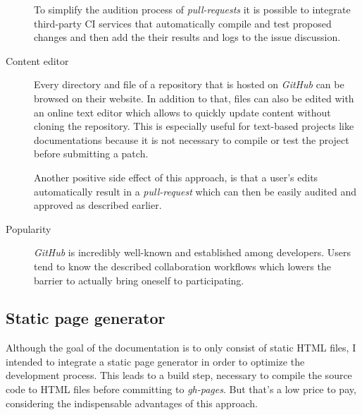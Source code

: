 \begin{description}
	To simplify the audition process of \textit{pull-requests} it is possible to integrate third-party \ac{CI} services that automatically compile and test proposed changes and then add the their results and logs to the issue discussion.

	\item[Content editor]\hfill

	Every directory and file of a repository that is hosted on \textit{GitHub} can be browsed on their website. In addition to that, files can also be edited with an online text editor which allows to quickly update content without cloning the repository. This is especially useful for text-based projects like documentations because it is not necessary to compile or test the project before submitting a patch.

	Another positive side effect of this approach, is that a user's edits automatically result in a \textit{pull-request} which can then be easily audited and approved as described earlier.

	\item[Popularity]\hfill

	\textit{GitHub} is incredibly well-known and established among developers. Users tend to know the described collaboration workflows which lowers the barrier to actually bring oneself to participating.

\end{description}

\subsection{Static page generator}

Although the goal of the documentation is to only consist of static \ac{HTML} files, I intended to integrate a static page generator in order to optimize the development process. This leads to a build step, necessary to compile the source code to \ac{HTML} files before committing to \textit{gh-pages}. But that's a low price to pay, considering the indispensable advantages of this approach.

